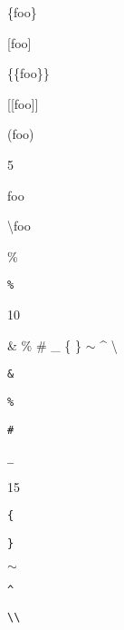 
\def\mytitle{Special Characters}


\{foo\}

{[foo]}

\{\{foo\}\}

{[{[foo]}]}

(foo)

5

\textbar{}foo\textbar{}

\textbackslash{}foo

\%

\texttt{\%}

10

\& \% \# \_ \{ \} \ensuremath{\sim} \^{} \textbackslash{}

\texttt{\&}

\texttt{\%}

\texttt{\#}

\texttt{\_}

15

\texttt{\{}

\texttt{\}}

\texttt{\ensuremath{\sim}}

\texttt{\^{}}

\texttt{\textbackslash{}\textbackslash{}}



